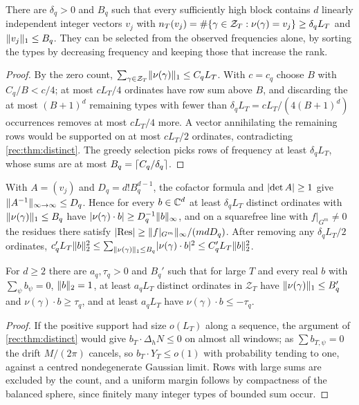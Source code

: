 \begin{theorem}\label{rec:thm:frequent}
There are $\delta_q>0$ and $B_q$ such that every sufficiently high block contains $d$ linearly
independent integer vectors $v_j$ with $n_T(v_j)=\#\{\gamma\in\mathcal Z_T:\nu(\gamma)=v_j\}\ge\delta_qL_T$
and $\lVert v_j\rVert_1\le B_q$. They can be selected from the observed frequencies alone, by sorting the
types by decreasing frequency and keeping those that increase the rank.
\end{theorem}

\begin{proof}
By the zero count, $\sum_{\gamma\in\mathcal Z_T}\lVert\nu(\gamma)\rVert_1\le C_qL_T$. With $c=c_q$ choose $B$ with
$C_q/B<c/4$; at most $cL_T/4$ ordinates have row sum above $B$, and discarding the at most
$(B+1)^d$ remaining types with fewer than $\delta_qL_T=cL_T/(4(B+1)^d)$ occurrences removes at most
$cL_T/4$ more. A vector annihilating the remaining rows would be supported on at most $cL_T/2$
ordinates, contradicting \cref{rec:thm:distinct}. The greedy selection picks rows of frequency at
least $\delta_qL_T$, whose sums are at most $B_q=\lceil C_q/\delta_q\rceil$.
\end{proof}

With $A=(v_j)$ and $D_q=d!B_q^{d-1}$, the cofactor formula and $\lvert\det A\rvert\ge1$ give
$\lVert A^{-1}\rVert_{\infty\to\infty}\le D_q$. Hence for every $b\in\mathbb{C}^d$ at least $\delta_qL_T$ distinct
ordinates with $\lVert\nu(\gamma)\rVert_1\le B_q$ have $\lvert\nu(\gamma)\cdot b\rvert\ge D_q^{-1}\lVert b\rVert_\infty$, and
on a squarefree line with $f|_{G^m}\ne0$ the residues there satisfy
$\lvert\operatorname{Res}\rvert\ge\lVert f|_{G^m}\rVert_\infty/(mdD_q)$. After removing any $\delta_qL_T/2$ ordinates,
$c_q'L_T\lVert b\rVert_2^2\le\sum_{\lVert\nu(\gamma)\rVert_1\le B_q}\lvert\nu(\gamma)\cdot b\rvert^2\le C_q'L_T\lVert b\rVert_2^2$.

\begin{proposition}\label{rec:prop:bothsigns}
For $d\ge2$ there are $a_q,\tau_q>0$ and $B_q'$ such that for large $T$ and every real $b$ with
$\sum_\psi b_\psi=0$, $\lVert b\rVert_2=1$, at least $a_qL_T$ distinct ordinates in $\mathcal Z_T$ have
$\lVert\nu(\gamma)\rVert_1\le B_q'$ and $\nu(\gamma)\cdot b\ge\tau_q$, and at least $a_qL_T$ have
$\nu(\gamma)\cdot b\le-\tau_q$.
\end{proposition}

\begin{proof}
If the positive support had size $o(L_T)$ along a sequence, the argument of \cref{rec:thm:distinct}
would give $b_T\cdot\Delta_hN\le0$ on almost all windows; as $\sum b_{T,\psi}=0$ the drift $M/(2\pi)$
cancels, so $b_T\cdot Y_T\le o(1)$ with probability tending to one, against a centred nondegenerate
Gaussian limit. Rows with large sums are excluded by the count, and a uniform margin follows by
compactness of the balanced sphere, since finitely many integer types of bounded sum occur.
\end{proof}

